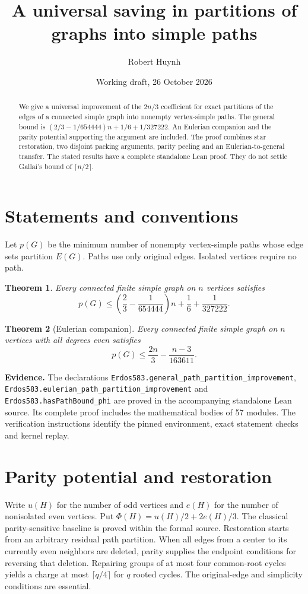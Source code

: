 \documentclass[11pt]{article}
\title{A universal saving in partitions of graphs into simple paths}
\author{Robert Huynh}
\date{Working draft, 26 October 2026}
\newtheorem{theorem}{Theorem}
\newcommand{\status}[1]{\par\noindent\textcolor{blue!45!black}{\textbf{Evidence.} #1}\par}
\begin{document}
\maketitle
\begin{abstract}
We give a universal improvement of the $2n/3$ coefficient for exact partitions of the edges of a connected simple graph into nonempty vertex-simple paths. The general bound is $(2/3-1/654444)n+1/6+1/327222$. An Eulerian companion and the parity potential supporting the argument are included. The proof combines star restoration, two disjoint packing arguments, parity peeling and an Eulerian-to-general transfer. The stated results have a complete standalone Lean proof. They do not settle Gallai's bound of $\lceil n/2\rceil$.
\end{abstract}
\tableofcontents

\section{Statements and conventions}
Let $p(G)$ be the minimum number of nonempty vertex-simple paths whose edge sets partition $E(G)$. Paths use only original edges. Isolated vertices require no path.
\begin{theorem}
Every connected finite simple graph on $n$ vertices satisfies
\[
 p(G)\leq\left(\frac23-\frac1{654444}\right)n
        +\frac16+\frac1{327222}.
\]
\end{theorem}
\begin{theorem}[Eulerian companion]
Every connected finite simple graph on $n$ vertices with all degrees even satisfies
\[
 p(G)\leq\frac{2n}{3}-\frac{n-3}{163611}.
\]
\end{theorem}
\status{The declarations \nolinkurl{Erdos583.general_path_partition_improvement}, \nolinkurl{Erdos583.eulerian_path_partition_improvement} and \nolinkurl{Erdos583.hasPathBound_phi} are proved in the accompanying standalone Lean source. Its complete proof includes the mathematical bodies of 57 modules. The verification instructions identify the pinned environment, exact statement checks and kernel replay.}
\section{Parity potential and restoration}
Write $u(H)$ for the number of odd vertices and $e(H)$ for the number of nonisolated even vertices. Put $\Phi(H)=u(H)/2+2e(H)/3$. The classical parity-sensitive baseline is proved within the formal source. Restoration starts from an arbitrary residual path partition. When all edges from a center to its currently even neighbors are deleted, parity supplies the endpoint conditions for reversing that deletion. Repairing groups of at most four common-root cycles yields a charge at most $\lceil q/4\rceil$ for $q$ rooted cycles. The original-edge and simplicity conditions are essential.
\end{document}
